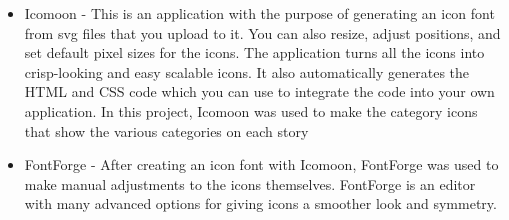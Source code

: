 \begin{itemize}
	\item Icomoon \cite{es4} - This is an application with the purpose of generating an icon font from svg files that you upload to it. You can also resize, adjust positions, and set default pixel sizes for the icons. The application turns all the icons into crisp-looking and easy scalable icons. It also automatically generates the HTML and CSS code which you can use to integrate the code into your own application. In this project, Icomoon was used to make the category icons that show the various categories on each story
	\item FontForge \cite{es5} - After creating an icon font with Icomoon, FontForge was used to make manual adjustments to the icons themselves. FontForge is an editor with many advanced options for giving icons a smoother look and symmetry.	
\end{itemize}

